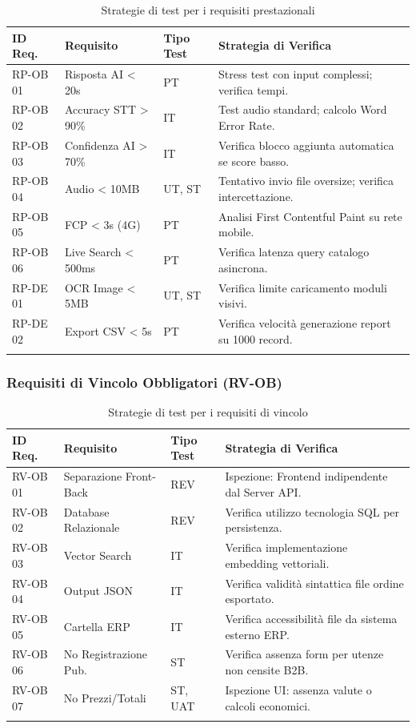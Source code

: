 \documentclass[a4paper,11pt,oneside]{scrartcl}
\begin{document}
\begin{longtable}{|p{1.5cm}|p{5.5cm}|p{1.8cm}|p{5cm}|}
\hline
\textbf{ID Req.} & \textbf{Requisito} & \textbf{Tipo Test} & \textbf{Strategia di Verifica} \\
\hline
RP-OB 01 & Risposta AI < 20s & PT & Stress test con input complessi; verifica tempi. \\ \hline
RP-OB 02 & Accuracy STT > 90\% & IT & Test audio standard; calcolo Word Error Rate. \\ \hline
RP-OB 03 & Confidenza AI > 70\% & IT & Verifica blocco aggiunta automatica se score basso. \\ \hline
RP-OB 04 & Audio < 10MB & UT, ST & Tentativo invio file oversize; verifica intercettazione. \\ \hline
RP-OB 05 & FCP < 3s (4G) & PT & Analisi First Contentful Paint su rete mobile. \\ \hline
RP-OB 06 & Live Search < 500ms & PT & Verifica latenza query catalogo asincrona. \\ \hline
RP-DE 01 & OCR Image < 5MB & UT, ST & Verifica limite caricamento moduli visivi. \\ \hline
RP-DE 02 & Export CSV < 5s & PT & Verifica velocità generazione report su 1000 record. \\ \hline
\caption{Strategie di test per i requisiti prestazionali}
\end{longtable}

\newpage
\subsubsection{Requisiti di Vincolo Obbligatori (RV-OB)}

\begin{longtable}{|p{1.5cm}|p{5.5cm}|p{1.8cm}|p{5cm}|}
\hline
\textbf{ID Req.} & \textbf{Requisito} & \textbf{Tipo Test} & \textbf{Strategia di Verifica} \\
\hline
RV-OB 01 & Separazione Front-Back & REV & Ispezione: Frontend indipendente dal Server API. \\ \hline
RV-OB 02 & Database Relazionale & REV & Verifica utilizzo tecnologia SQL per persistenza. \\ \hline
RV-OB 03 & Vector Search & IT & Verifica implementazione embedding vettoriali. \\ \hline
RV-OB 04 & Output JSON & IT & Verifica validità sintattica file ordine esportato. \\ \hline
RV-OB 05 & Cartella ERP & IT & Verifica accessibilità file da sistema esterno ERP. \\ \hline
RV-OB 06 & No Registrazione Pub. & ST & Verifica assenza form per utenze non censite B2B. \\ \hline
RV-OB 07 & No Prezzi/Totali & ST, UAT & Ispezione UI: assenza valute o calcoli economici. \\ \hline
\caption{Strategie di test per i requisiti di vincolo}
\end{longtable}
\newpage
\end{document}
